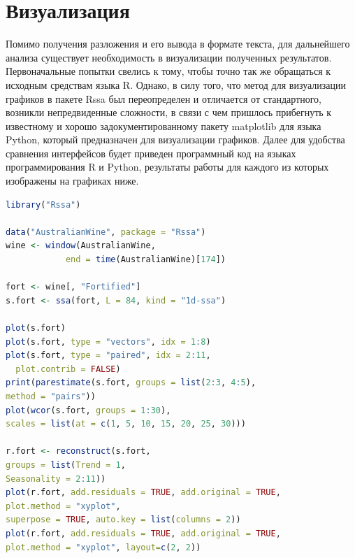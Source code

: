 \documentclass[specialist,
			   substylefile = spbu_report.rtx,
			   subf,href,colorlinks=true, 12pt]{disser}
\begin{document}
\section{Визуализация}

Помимо получения разложения и его вывода в формате текста, для дальнейшего анализа существует необходимость в визуализации полученных результатов. Первоначальные попытки свелись к тому, чтобы точно так же обращаться к исходным средствам языка R. Однако, в силу того, что метод для визуализации графиков в пакете Rssa был переопределен и отличается от стандартного, возникли непредвиденные сложности, в связи с чем пришлось прибегнуть к известному и хорошо задокументированному пакету matplotlib \cite{matplotlib-doc} для языка Python, который предназначен для визуализации графиков. Далее для удобства сравнения интерфейсов будет приведен программный код на языках программирования R и Python, результаты работы для каждого из которых изображены на графиках ниже.

\begin{lstlisting}[language=R, caption=Программный код для визуализации разложения и восстановления ряда AustralianWine на языке R.]
library("Rssa")

data("AustralianWine", package = "Rssa")
wine <- window(AustralianWine, 
            end = time(AustralianWine)[174])

fort <- wine[, "Fortified"]
s.fort <- ssa(fort, L = 84, kind = "1d-ssa")

plot(s.fort)
plot(s.fort, type = "vectors", idx = 1:8)
plot(s.fort, type = "paired", idx = 2:11, 
  plot.contrib = FALSE)
print(parestimate(s.fort, groups = list(2:3, 4:5), 
method = "pairs"))
plot(wcor(s.fort, groups = 1:30),
scales = list(at = c(1, 5, 10, 15, 20, 25, 30)))

r.fort <- reconstruct(s.fort, 
groups = list(Trend = 1,
Seasonality = 2:11))
plot(r.fort, add.residuals = TRUE, add.original = TRUE,
plot.method = "xyplot",
superpose = TRUE, auto.key = list(columns = 2))
plot(r.fort, add.residuals = TRUE, add.original = TRUE,
plot.method = "xyplot", layout=c(2, 2))
\end{lstlisting}
\end{document}
